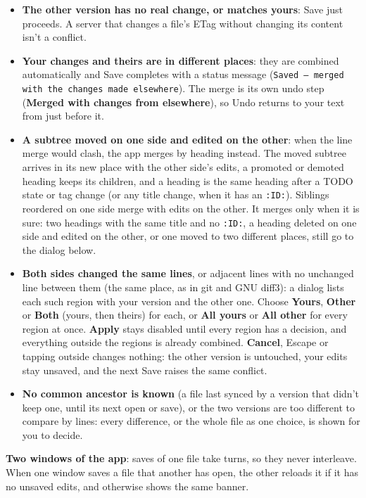 \documentclass[11pt]{article}
\begin{document}
\begin{itemize}
\item \textbf{The other version has no real change, or matches yours}: Save just proceeds. A server that changes a file's ETag without changing its content isn't a conflict.
\item \textbf{Your changes and theirs are in different places}: they are combined automatically and Save completes with a status message (\texttt{Saved — merged with the changes made elsewhere}). The merge is its own undo step (\textbf{Merged with changes from elsewhere}), so Undo returns to your text from just before it.
\item \textbf{A subtree moved on one side and edited on the other}: when the line merge would clash, the app merges by heading instead. The moved subtree arrives in its new place with the other side's edits, a promoted or demoted heading keeps its children, and a heading is the same heading after a TODO state or tag change (or any title change, when it has an \texttt{:ID:}). Siblings reordered on one side merge with edits on the other. It merges only when it is sure: two headings with the same title and no \texttt{:ID:}, a heading deleted on one side and edited on the other, or one moved to two different places, still go to the dialog below.
\item \textbf{Both sides changed the same lines}, or adjacent lines with no unchanged line between them (the same place, as in git and GNU diff3): a dialog lists each such region with your version and the other one. Choose \textbf{Yours}, \textbf{Other} or \textbf{Both} (yours, then theirs) for each, or \textbf{All yours} or \textbf{All other} for every region at once. \textbf{Apply} stays disabled until every region has a decision, and everything outside the regions is already combined. \textbf{Cancel}, Escape or tapping outside changes nothing: the other version is untouched, your edits stay unsaved, and the next Save raises the same conflict.
\item \textbf{No common ancestor is known} (a file last synced by a version that didn't keep one, until its next open or save), or the two versions are too different to compare by lines: every difference, or the whole file as one choice, is shown for you to decide.
\end{itemize}

\textbf{Two windows of the app}: saves of one file take turns, so they never interleave. When one window saves a file that another has open, the other reloads it if it has no unsaved edits, and otherwise shows the same banner.
\end{document}
